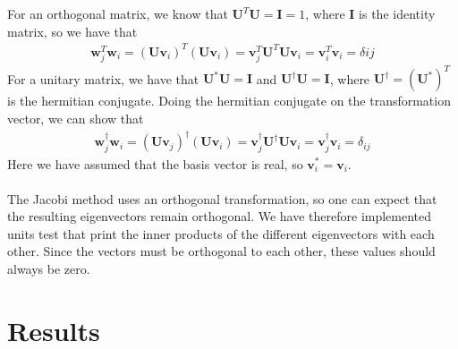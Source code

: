 \documentclass{article}
\begin{document}
For an orthogonal matrix, we know that $\mathbf{U}^T\mathbf{U} = \mathbf{I}=1$, where $\mathbf{I}$ is the identity matrix, so we have that
\begin{align}
\mathbf{w}_j^T\mathbf{w}_i = (\mathbf{U}\mathbf{v}_i)^T(\mathbf{U}\mathbf{v}_i) = \mathbf{v}_j^T \mathbf{U}^T\mathbf{U}\mathbf{v}_i = \mathbf{v}_i^T\mathbf{v}_i = \delta{ij}
\end{align}
For a unitary matrix, we have that $\mathbf{U^*}\mathbf{U}=\mathbf{I}$ and $\mathbf{U}^{\dagger}\mathbf{U} = \mathbf{I}$, where $\mathbf{U}^{\dagger} = (\mathbf{U}^*)^T$ is the hermitian conjugate. Doing the hermitian conjugate on the transformation vector, we can show that
\begin{align}
\mathbf{w}_j^{\dagger}\mathbf{w}_i = (\mathbf{U}\mathbf{v}_j)^{\dagger}(\mathbf{U}\mathbf{v}_i) = \mathbf{v}_j^{\dagger}\mathbf{U}^{\dagger}\mathbf{U}\mathbf{v}_i = \mathbf{v}_j^{\dagger}\mathbf{v}_i = \delta_{ij}
\end{align}
Here we have assumed that the basis vector is real, so $\mathbf{v}_i^* = \mathbf{v}_i$.\\\\
The Jacobi method uses an orthogonal transformation, so one can expect that the resulting eigenvectors remain orthogonal. We have therefore implemented units test that print the inner products of the different eigenvectors with each other. Since the vectors must be orthogonal to each other, these values should always be zero.

\section{Results}
\end{document}
